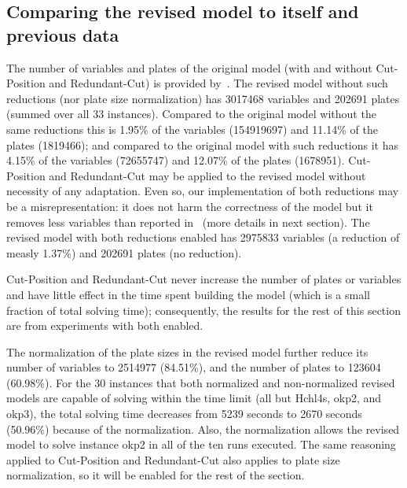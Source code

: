 \documentclass[runningheads]{llncs}
\begin{document}
\subsection{Comparing the revised model to itself and previous data}

The number of variables and plates of the original model (with and without Cut-Position and Redundant-Cut) is provided by~\cite{DIMITRI}.
The revised model without such reductions (nor plate size normalization) has 3017468 variables and 202691 plates (summed over all 33 instances). Compared to the original model without the same reductions this is 1.95\% of the variables (154919697) and 11.14\% of the plates (1819466); and compared to the original model with such reductions it has 4.15\% of the variables (72655747) and 12.07\% of the plates (1678951).
Cut-Position and Redundant-Cut may be applied to the revised model without necessity of any adaptation.
Even so, our implementation of both reductions may be a misrepresentation: it does not harm the correctness of the model but it removes less variables than reported in~\cite{DIMITRI} (more details in next section).
The revised model with both reductions enabled has 2975833 variables (a reduction of measly 1.37\%) and 202691 plates (no reduction). 

Cut-Position and Redundant-Cut never increase the number of plates or variables and have little effect in the time spent building the model (which is a small fraction of total solving time); consequently, the results for the rest of this section are from experiments with both enabled.

The normalization of the plate sizes in the revised model further reduce its number of variables to 2514977 (84.51\%), and the number of plates to 123604 (60.98\%).
For the 30 instances that both normalized and non-normalized revised models are capable of solving within the time limit (all but Hchl4s, okp2, and okp3), the total solving time decreases from 5239 seconds to 2670 seconds (50.96\%) because of the normalization.
Also, the normalization allows the revised model to solve instance okp2 in all of the ten runs executed. %
The same reasoning applied to Cut-Position and Redundant-Cut also applies to plate size normalization, so it will be enabled for the rest of the section.
\end{document}
